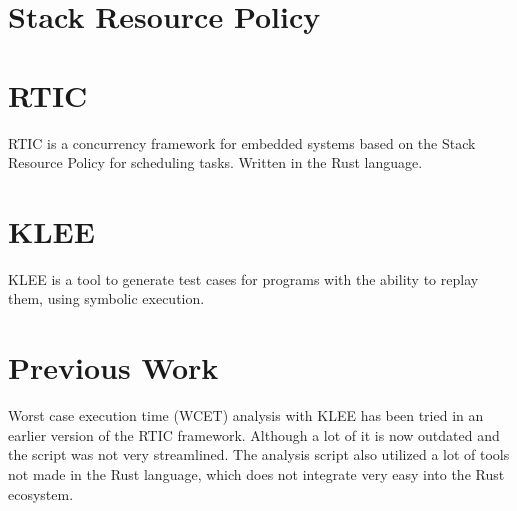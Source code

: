 \section{Stack Resource Policy}


\section{RTIC}
RTIC\cite{rticwebsite} is a concurrency framework for embedded systems based on the Stack Resource Policy\cite{srp} for scheduling tasks. Written in the Rust language.

\section{KLEE}
KLEE\cite{kleewebsite} is a tool to generate test cases for programs with the ability to replay them, using symbolic execution.

\section{Previous Work}
Worst case execution time (WCET) analysis with KLEE has been tried in an earlier version of the RTIC framework\cite{lindner}.
Although a lot of it is now outdated and the script was not very streamlined. The analysis script also utilized a lot of tools not made in the Rust language, which does not integrate very easy into the Rust ecosystem.


